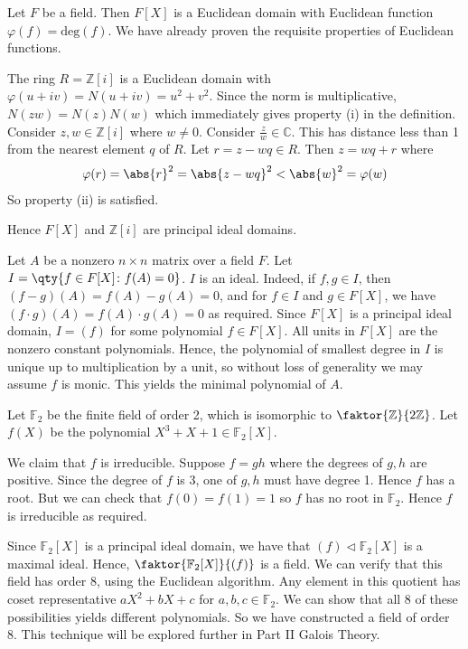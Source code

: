 \begin{example}
	Let $F$ be a field.
	Then $F[X]$ is a Euclidean domain with Euclidean function $\varphi(f) = \mathrm{deg}(f)$.
	We have already proven the requisite properties of Euclidean functions.

	The ring $R = \mathbb Z[i]$ is a Euclidean domain with $\varphi(u+iv) = N(u+iv) = u^2+v^2$.
	Since the norm is multiplicative, $N(zw) = N(z)N(w)$ which immediately gives property (i) in the definition.
	Consider $z, w \in \mathbb Z[i]$ where $w \neq 0$.
	Consider $\frac{z}{w} \in \mathbb C$.
	This has distance less than 1 from the nearest element $q$ of $R$.
	Let $r = z - w q \in R$.
	Then $z = w q + r$ where
	\begin{align*}
		\varphi(r) = \abs{r}^2 = \abs{z - w q}^2 < \abs{w}^2 = \varphi(w)
	\end{align*}
	So property (ii) is satisfied.

	Hence $F[X]$ and $\mathbb Z[i]$ are principal ideal domains.
\end{example}
\begin{example}
	Let $A$ be a nonzero $n \times n$ matrix over a field $F$.
	Let $I = \qty{f \in F[X] \colon f(A) = 0}$.
	$I$ is an ideal.
	Indeed, if $f, g \in I$, then $(f-g)(A) = f(A) - g(A) = 0$, and for $f \in I$ and $g \in F[X]$, we have $(f \cdot g)(A) = f(A) \cdot g(A) = 0$ as required.
	Since $F[X]$ is a principal ideal domain, $I = (f)$ for some polynomial $f \in F[X]$.
	All units in $F[X]$ are the nonzero constant polynomials.
	Hence, the polynomial of smallest degree in $I$ is unique up to multiplication by a unit, so without loss of generality we may assume $f$ is monic.
	This yields the minimal polynomial of $A$.
\end{example}
\begin{example}
	Let $\mathbb F_2$ be the finite field of order 2, which is isomorphic to $\faktor{\mathbb Z}{2 \mathbb Z}$.
	Let $f(X)$ be the polynomial $X^3 + X + 1 \in \mathbb F_2[X]$.

	We claim that $f$ is irreducible.
	Suppose $f = gh$ where the degrees of $g, h$ are positive.
	Since the degree of $f$ is 3, one of $g, h$ must have degree 1.
	Hence $f$ has a root.
	But we can check that $f(0) = f(1) = 1$ so $f$ has no root in $\mathbb F_2$.
	Hence $f$ is irreducible as required.

	Since $\mathbb F_2[X]$ is a principal ideal domain, we have that $(f) \triangleleft \mathbb F_2[X]$ is a maximal ideal.
	Hence, $\faktor{\mathbb F_2[X]}{(f)}$ is a field.
	We can verify that this field has order 8, using the Euclidean algorithm.
	Any element in this quotient has coset representative $aX^2 + bX + c$ for $a,b,c \in \mathbb F_2$.
	We can show that all 8 of these possibilities yields different polynomials.
	So we have constructed a field of order 8.
	This technique will be explored further in Part II Galois Theory.
\end{example}
